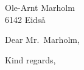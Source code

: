 \documentclass[10pt,a4paper]{letter}
\begin{document}
 
\begin{letter}{Ole-Arnt Marholm\\6142 Eidså} 
\opening{Dear Mr.\ Marholm,} 
 
\lipsum[1-3]
 
\closing{Kind regards,} 
\end{letter} 
\end{document}
